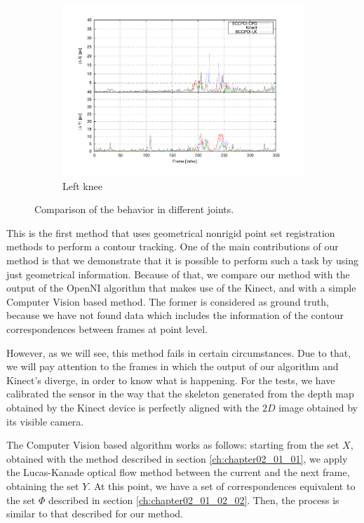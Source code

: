\begin{figure}[t]
        \begin{subfigure}[b]{0.5\columnwidth}
                \centering
                \includegraphics[width=\textwidth, trim=50 40 80 40,clip]{fig29.pdf}
                \caption{Left knee}
                \label{fig:cp02_comparison_left_knee}
        \end{subfigure}%

        \caption{Comparison of the behavior in different joints.}\label{fig:cp02_comparison}
\end{figure}

This is the first method that uses geometrical nonrigid point set 
registration methods to perform a contour tracking. One of the main contributions of our method is that we demonstrate 
that it is possible to perform such a task by using just geometrical information. Because of that, we compare our method 
with the output of the OpenNI algorithm that makes use of the Kinect, and with a simple Computer Vision based method. The 
former is considered as ground truth, because we have not found data which includes the information of 
the contour correspondences between frames at point level. 

However, as we will see, this method fails in certain circumstances. Due to that, we will pay attention to the frames in which the output of 
our algorithm and Kinect's diverge, in order to know what is happening. For the tests, we have calibrated the sensor in 
the way that the skeleton generated from the depth map obtained by the Kinect device is perfectly aligned with the $2D$ 
image obtained by its visible camera.

The Computer Vision based algorithm works as follows: starting from the set $X$, obtained with the method described in 
section \ref{ch:chapter02_01_01}, we apply the Lucas-Kanade \citep{bouguet2001pyramidal} optical flow 
method between the current and the next frame, obtaining the set $Y$. At this point, we have a set of correspondences 
equivalent to the set $\Phi$ described in section \ref{ch:chapter02_01_02_02}. Then, the process is similar to 
that described for our method.

